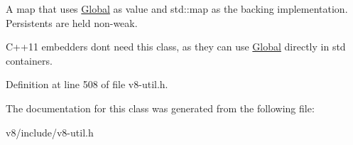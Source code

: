 A map that uses \mbox{\hyperlink{classv8_1_1Global}{Global}} as value and std\+::map as the backing implementation. Persistents are held non-\/weak.

C++11 embedders don\textquotesingle{}t need this class, as they can use \mbox{\hyperlink{classv8_1_1Global}{Global}} directly in std containers. 

Definition at line 508 of file v8-\/util.\+h.



The documentation for this class was generated from the following file\+:\begin{DoxyCompactItemize}
\item 
v8/include/v8-\/util.\+h\end{DoxyCompactItemize}
